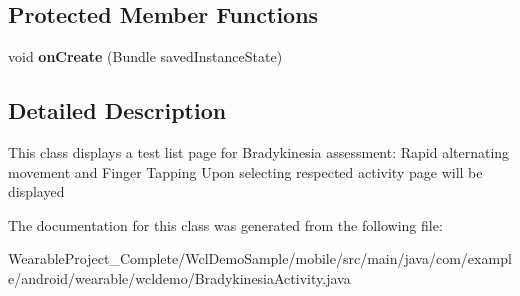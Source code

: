 \subsection*{Protected Member Functions}
\begin{DoxyCompactItemize}
\item 
void {\bfseries on\+Create} (Bundle saved\+Instance\+State)\hypertarget{classcom_1_1example_1_1android_1_1wearable_1_1wcldemo_1_1BradykinesiaActivity_a4302240214033e7df45e3c2d57bd8098}{}\label{classcom_1_1example_1_1android_1_1wearable_1_1wcldemo_1_1BradykinesiaActivity_a4302240214033e7df45e3c2d57bd8098}

\end{DoxyCompactItemize}


\subsection{Detailed Description}
This class displays a test list page for Bradykinesia assessment\+: Rapid alternating movement and Finger Tapping Upon selecting respected activity page will be displayed 

The documentation for this class was generated from the following file\+:\begin{DoxyCompactItemize}
\item 
Wearable\+Project\+\_\+\+Complete/\+Wcl\+Demo\+Sample/mobile/src/main/java/com/example/android/wearable/wcldemo/Bradykinesia\+Activity.\+java\end{DoxyCompactItemize}
